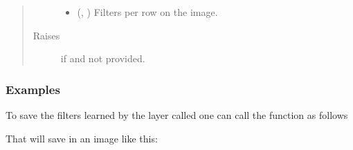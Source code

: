 \documentclass[letterpaper,10pt,english]{sphinxmanual}
\begin{document}
\begin{fulllineitems}
\begin{quote}
\begin{description}
\begin{itemize}
\item {} 
 (, ) \textendash{} Filters per row on the image.

\end{itemize}

\item[{Raises}] \leavevmode
{} \textendash{} if  and  not provided.

\end{description}\end{quote}
\subsubsection*{Examples}

To save the filters learned by the layer called  one can call
the function as follows

\begin{sphinxVerbatim}[commandchars=\\\{\}]
   
\end{sphinxVerbatim}

That will save in  an image like this:


\end{fulllineitems}

\end{document}

